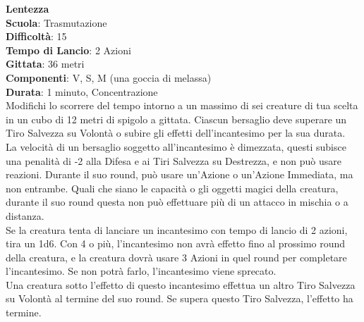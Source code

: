 \begin{multicols}{2}
\medskip\hypertarget{lentezza}{\textbf{Lentezza}}\\
\textbf{Scuola}: Trasmutazione\\
\textbf{Difficoltà}: 15\\
\textbf{Tempo di Lancio}: 2 Azioni\\
\textbf{Gittata}: 36 metri\\
\textbf{Componenti}: V, S, M (una goccia di melassa) \\
\textbf{Durata}: 1 minuto, Concentrazione\\
Modifichi lo scorrere del tempo intorno a un massimo di sei creature di tua scelta in un cubo di 12 metri di spigolo a gittata. Ciascun bersaglio deve superare un Tiro Salvezza su Volontà o subire gli effetti dell'incantesimo per la sua durata.\\
La velocità di un bersaglio soggetto all'incantesimo è dimezzata, questi subisce una penalità di -2 alla Difesa e ai Tiri Salvezza su Destrezza, e non può usare reazioni. Durante il suo round, può usare un'Azione o un'Azione Immediata, ma non entrambe. Quali che siano le capacità o gli oggetti magici della creatura, durante il suo round questa non può effettuare più di un attacco in mischia o a distanza.\\
Se la creatura tenta di lanciare un incantesimo con tempo di lancio di 2 azioni, tira un 1d6. Con 4 o più, l'incantesimo non avrà effetto fino al prossimo round della creatura, e la creatura dovrà usare 3 Azioni in quel round per completare l'incantesimo. Se non potrà farlo, l'incantesimo viene sprecato.\\
Una creatura sotto l'effetto di questo incantesimo effettua un altro Tiro Salvezza su Volontà al termine del suo round. Se supera questo Tiro Salvezza, l'effetto ha termine.\\


\end{multicols}

